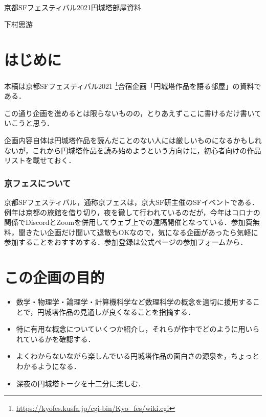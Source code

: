 \documentclass[10pt, a5paper, twoside]{jsarticle}
\begin{document}
	{\Large 　} %

	\begin{center}

		\Large{京都SFフェスティバル2021円城塔部屋資料}

		\vspace{3mm}
		
		\large{下村思游}

	\end{center}

	\vspace{3mm}

	\section{はじめに}

		本稿は京都SFフェスティバル2021 \footnote{ \url{https://kyofes.kusfa.jp/cgi-bin/Kyo_fes/wiki.cgi} }合宿企画「円城塔作品を語る部屋」の資料である．

		この通り企画を進めるとは限らないものの，とりあえずここに書けるだけ書いていこうと思う．

		企画内容自体は円城塔作品を読んだことのない人には厳しいものになるかもしれないが，これから円城塔作品を読み始めようという方向けに，初心者向けの作品リストを載せておく．

		\subsubsection*{京フェスについて}

			京都SFフェスティバル，通称京フェスは，京大SF研主催のSFイベントである．例年は京都の旅館を借り切り，夜を徹して行われているのだが，今年はコロナの関係でDiscordとZoomを併用してウェブ上での遠隔開催となっている．参加費無料，聞きたい企画だけ聞いて退散もOKなので，気になる企画があったら気軽に参加することをおすすめする．参加登録は公式ページの参加フォームから．

	\section{この企画の目的}

		\begin{itemize}

			\item 数学・物理学・論理学・計算機科学など数理科学の概念を適切に援用することで，円城塔作品の見通しが良くなることを指摘する．

			\item 特に有用な概念についていくつか紹介し，それらが作中でどのように用いられているかを確認する．

			\item よくわからないながら楽しんでいる円城塔作品の面白さの源泉を，ちょっとわかるようになる．

			\item 深夜の円城塔トークを十二分に楽しむ．

		\end{itemize}
\end{document}

